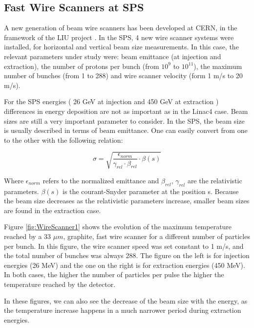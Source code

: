 \subsection{Fast Wire Scanners at SPS}

A new generation of beam wire scanners has been developed at CERN, in the framework of the LIU project \parencite[][]{ref:WireScanJose}. In the SPS, 4 new wire scanner systems were installed, for horizontal and vertical beam size measurements. In this case, the relevant parameters under study were: beam emittance (at injection and extraction), the number of protons per bunch (from $10^9$ to $10^{11}$), the maximum number of bunches (from 1 to 288) and wire scanner velocity (form 1 m/s to 20 m/s). 

For the SPS energies ( 26 GeV at injection and 450 GeV at extraction ) differences in energy deposition are not as important as in the Linac4 case. Beam sizes are still a very important parameter to consider. In the SPS, the beam size is usually described in terms of beam emittance. One can easily convert from one to the other with the following relation: 

\begin{equation}
    \sigma = \sqrt{\frac{\epsilon_{norm}}{\gamma_{rel} \cdot \beta_{rel}} \cdot \beta(s)}
\end{equation}

Where $\epsilon_{norm}$ refers to the normalized emittance and $\beta_{rel}$, $\gamma_{rel}$ are the relativistic parameters. $\beta(s)$ is the courant-Snyder parameter at the position s. Because the beam size decreases as the relativistic parameters increase, smaller beam sizes are found in the extraction case. 

Figure \ref{fig:WireScanner1} shows the evolution of the maximum temperature reached by a 33 $\mu m$, graphite, fast wire scanner for a different number of particles per bunch. In this figure, the wire scanner speed was set constant to 1 m/s, and the total number of bunches was always 288.  The figure on the left is for injection energies (26 MeV) and the one on the right is for extraction energies (450 MeV). In both cases, the higher the number of particles per pulse the higher the temperature reached by the detector. 

In these figures, we can also see the decrease of the beam size with the energy, as the temperature increase happens in a much narrower period during extraction energies. 

